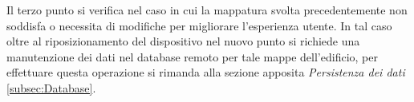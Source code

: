 \documentclass[../ManualeSviluppatore.tex]{subfiles}
\begin{document}
		 Il terzo punto si verifica nel caso in cui la mappatura svolta precedentemente non soddisfa o necessita di modifiche per migliorare l'esperienza utente. In tal caso oltre al riposizionamento del dispositivo nel nuovo punto si richiede una manutenzione dei dati nel database remoto per tale mappe dell'edificio, per effettuare questa operazione si rimanda alla sezione apposita \textit{Persistenza dei dati} \ref{subsec:Database}.
		 
\end{document}

